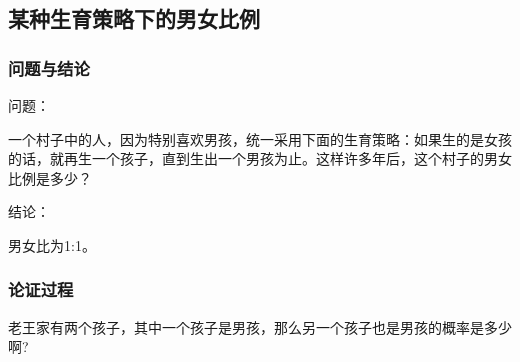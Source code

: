 
\subsection{某种生育策略下的男女比例}

\subsubsection{问题与结论}

问题：

一个村子中的人，因为特别喜欢男孩，统一采用下面的生育策略：如果生的是女孩的话，就再生一个孩子，直到生出一个男孩为止。这样许多年后，这个村子的男女比例是多少？

结论：

男女比为1:1。

\subsubsection{论证过程}



老王家有两个孩子，其中一个孩子是男孩，那么另一个孩子也是男孩的概率是多少啊?